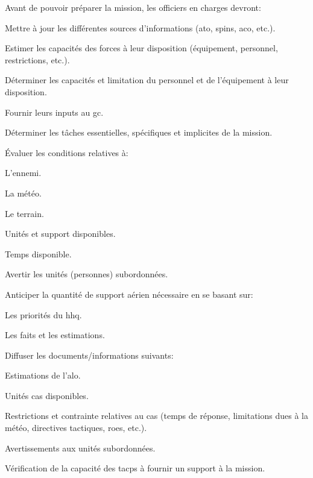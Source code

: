 \begin{e1}
	\item Avant de pouvoir préparer la mission, les officiers en charges devront:
	\begin{e2}
		\item Mettre à jour les différentes sources d'informations (\gls{ato}, \gls{spins}, \gls{aco}, etc.).
		\item Estimer les capacités des forces à leur disposition (équipement, personnel, restrictions, etc.).
		\item Déterminer les capacités et limitation du personnel et de l'équipement à leur disposition.
		\item Fournir leurs inputs au \gls{gc}.
		\item Déterminer les tâches essentielles, spécifiques et implicites de la mission.
		\item Évaluer les conditions relatives à:
		\begin{e3}
			\item L'ennemi.
			\item La météo.
			\item Le terrain.
			\item Unités et support disponibles.
			\item Temps disponible.
		\end{e3}
		\item Avertir les unités (personnes) subordonnées.
		\item Anticiper la quantité de support aérien nécessaire en se basant sur:
		\begin{e3}
			\item Les priorités du \gls{hhq}.
			\item Les faits et les estimations.			
		\end{e3}
		\item Diffuser les documents/informations suivants:
		\begin{e3}
			\item Estimations de l'\gls{alo}.
			\item Unités \gls{cas} disponibles.
			\item Restrictions et contrainte relatives au \gls{cas} (temps de réponse, limitations dues à la météo, directives tactiques, \glspl{roe}, etc.).
			\item Avertissements aux unités subordonnées.
			\item Vérification de la capacité des \glspl{tacp} à fournir un support à la mission.
		\end{e3}
	\end{e2}
	

\end{e1}
